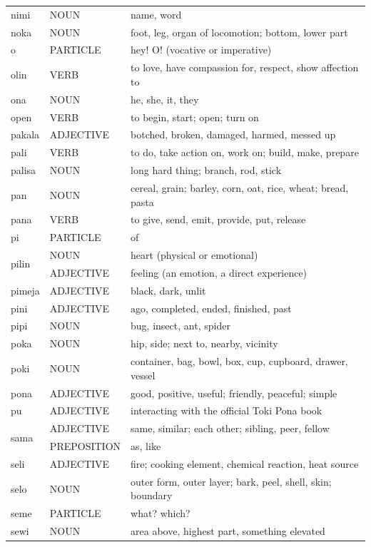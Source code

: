 \documentclass[14pt, a4paper]{extreport}
\begin{document}
\begin{longtable}{llp{10cm}}
  nimi & NOUN & name, word \\
  noka & NOUN & foot, leg, organ of locomotion; bottom, lower part \\
  o & PARTICLE & hey! O! (vocative or imperative) \\
  olin & VERB & to love, have compassion for, respect, show affection to \\
  ona & NOUN & he, she, it, they \\
  open & VERB & to begin, start; open; turn on \\
  pakala & ADJECTIVE & botched, broken, damaged, harmed, messed up \\
  pali & VERB & to do, take action on, work on; build, make, prepare \\
  palisa & NOUN & long hard thing; branch, rod, stick \\
  pan & NOUN & cereal, grain; barley, corn, oat, rice, wheat; bread, pasta \\
  pana & VERB & to give, send, emit, provide, put, release \\
  pi & PARTICLE & of \\
  \multirow[t]{2}{*}{pilin} & NOUN & heart (physical or emotional) \\
  & ADJECTIVE & feeling (an emotion, a direct experience) \\
  pimeja & ADJECTIVE & black, dark, unlit \\
  pini & ADJECTIVE & ago, completed, ended, finished, past \\
  pipi & NOUN & bug, insect, ant, spider \\
  poka & NOUN & hip, side; next to, nearby, vicinity \\
  poki & NOUN & container, bag, bowl, box, cup, cupboard, drawer, vessel \\
  pona & ADJECTIVE & good, positive, useful; friendly, peaceful; simple \\
  pu & ADJECTIVE & interacting with the official Toki Pona book \\
  \multirow[t]{2}{*}{sama} & ADJECTIVE & same, similar; each other; sibling, peer, fellow \\
  & PREPOSITION & as, like \\
  seli & ADJECTIVE & fire; cooking element, chemical reaction, heat source \\
  selo & NOUN & outer form, outer layer; bark, peel, shell, skin; boundary \\
  seme & PARTICLE & what? which? \\
  \multirow[t]{2}{*}{sewi} & NOUN & area above, highest part, something elevated \\

\end{longtable}
\end{document}
